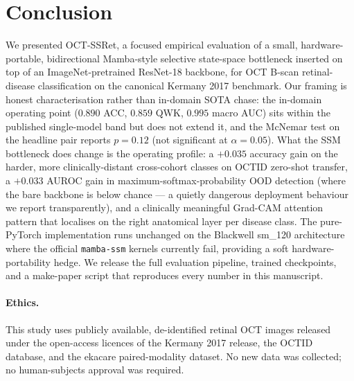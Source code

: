 \documentclass[5p]{elsarticle}
\begin{document}
\section{Conclusion}
We presented OCT-SSRet, a focused empirical evaluation of a small, hardware-portable, bidirectional Mamba-style selective state-space bottleneck inserted on top of an ImageNet-pretrained ResNet-18 backbone, for OCT B-scan retinal-disease classification on the canonical Kermany 2017 benchmark. Our framing is honest characterisation rather than in-domain SOTA chase: the in-domain operating point ($0.890$ ACC, $0.859$ QWK, $0.995$ macro AUC) sits within the published single-model band but does not extend it, and the McNemar test on the headline pair reports $p=0.12$ (not significant at $\alpha=0.05$). What the SSM bottleneck does change is the operating profile: a $+0.035$ accuracy gain on the harder, more clinically-distant cross-cohort classes on OCTID zero-shot transfer, a $+0.033$ AUROC gain in maximum-softmax-probability OOD detection (where the bare backbone is below chance --- a quietly dangerous deployment behaviour we report transparently), and a clinically meaningful Grad-CAM attention pattern that localises on the right anatomical layer per disease class. The pure-PyTorch implementation runs unchanged on the Blackwell sm\_120 architecture where the official \texttt{mamba-ssm} kernels currently fail, providing a soft hardware-portability hedge. We release the full evaluation pipeline, trained checkpoints, and a make-paper script that reproduces every number in this manuscript.

\paragraph{Ethics.} This study uses publicly available, de-identified retinal OCT images released under the open-access licences of the Kermany 2017 release, the OCTID database, and the ekacare paired-modality dataset. No new data was collected; no human-subjects approval was required.



\end{document}
